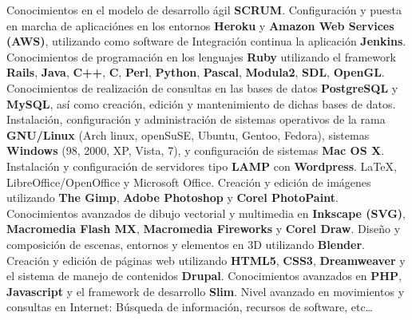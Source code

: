 \documentclass[11pt,a4paper]{moderncv}
\begin{document}
\cvline{}{}
       {Conocimientos en el modelo de desarrollo ágil \textbf{SCRUM}.
       }
\cvline{}{}
       {Configuración y puesta en marcha de aplicaciónes en los entornos \textbf{Heroku} y \textbf{Amazon Web Services (AWS)}, utilizando como software de Integración continua la aplicación \textbf{Jenkins}.
       }
\cvline{}{}
       {Conocimientos de programación en los lenguajes \textbf{Ruby} utilizando el framework \textbf{Rails}, \textbf{Java}, \textbf{C++}, \textbf{C}, \textbf{Perl}, \textbf{Python}, \textbf{Pascal}, \textbf{Modula2}, \textbf{SDL}, \textbf{OpenGL}.
       }
\cvline{}{}
       {Conocimientos de realización de consultas en las bases de datos \textbf{PostgreSQL} y \textbf{MySQL}, así como creación, edición y mantenimiento de dichas bases de datos.
       }
\cvline{}{}
       {Instalación, configuración y administración de sistemas operativos de la rama \textbf{GNU/Linux} (Arch linux, openSuSE, Ubuntu, Gentoo, Fedora), sistemas \textbf{Windows} (98, 2000, XP, Vista, 7), y configuración de sistemas \textbf{Mac OS X}.
       }
\cvline{}{}
       {Instalación y configuración de servidores tipo \textbf{LAMP} con \textbf{Wordpress}.
       }
\cvline{}{}
       {\LaTeX{}, LibreOffice/OpenOffice y Microsoft Office.
       }
\cvline{}{}
       {Creación y edición de imágenes utilizando \textbf{The Gimp}, \textbf{Adobe Photoshop} y \textbf{Corel PhotoPaint}.
        \newline{}
        Conocimientos avanzados de dibujo vectorial y multimedia en \textbf{Inkscape (SVG)}, \textbf{Macromedia Flash MX}, \textbf{Macromedia Fireworks} y \textbf{Corel Draw}.
        \newline{}
        Diseño y composición de escenas, entornos y elementos en 3D utilizando \textbf{Blender}.
       }
\cvline{}{}
       {Creación y edición de páginas web utilizando \textbf{HTML5}, \textbf{CSS3}, \textbf{Dreamweaver} y el sistema de manejo de contenidos \textbf{Drupal}.
       \newline{}
       Conocimientos avanzados en \textbf{PHP}, \textbf{Javascript} y el framework de desarrollo \textbf{Slim}.
       }
\cvline{}{}
       {Nivel avanzado en movimientos y consultas en Internet: Búsqueda de información, recursos de software, etc\dots
       }

\end{document}
